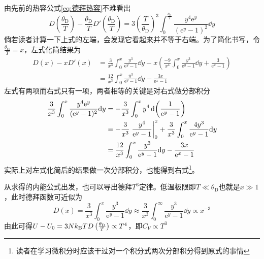 \documentclass[../../main.tex]{subfiles}
\begin{document}
\begin{example}
\begin{solution}
\begin{equation}
\begin{split}
            \end{split}
        \end{equation}
        由先前的热容公式\eqref{eq:德拜热容}不难看出
        \begin{equation}
            D\left(\frac{\theta_{\mathrm{D}}}{T}\right)-\frac{\theta_{\mathrm{D}}}{T}D'\left(\frac{\theta_{\mathrm{D}}}{T}\right)=3\left(\frac{T}{\theta_{\mathrm{D}}}\right)^3\int_0^{\frac{\theta_{\mathrm{D}}}{T}}\frac{y^4\mathrm{e}^{y}}{(\mathrm{e}^{y}-1)^2}\dd y 
        \end{equation}
        倘若读者计算一下上式的左端，会发现它看起来并不等于右端。为了简化书写，令\(\frac{\theta_{\mathrm{D}}}{T}=x\)，左式化简结果为
        \begin{equation}
            \begin{split}
                D(x)-xD'(x)&=\frac{3}{x^3}\int_0^{x}\frac{y^3}{\mathrm{e}^y-1}\dd y-x\left(\frac{-9}{x^4}\int_0^{x}\frac{y^3}{\mathrm{e}^y-1}\dd y+\frac{3}{\mathrm{e}^x-1}\right) \\
                &=\frac{12}{x^3}\int_0^{x}\frac{y^3}{\mathrm{e}^y-1}\dd y-\frac{3x}{\mathrm{e}^x-1}
            \end{split}
        \end{equation}
        左式有两项而右式只有一项，两者相等的关键是对右式做分部积分
        \begin{equation}
            \begin{split}
                \frac{3}{x^3}\int_0^x\frac{y^4\mathrm{e}^y}{(\mathrm{e}^y-1)^2}\dd y&=-\frac{3}{x^3}\int_0^xy^4\dd(\frac{1}{\mathrm{e}^y-1}) \\
                &=-\frac{3}{x^3}\eval{\frac{y^4}{\mathrm{e}^y-1}}_{0}^{x}+\frac{3}{x^3}\int_0^x\frac{4y^3}{\mathrm{e}^y-1}\dd y \\
                &=\frac{12}{x^3}\int_0^{x}\frac{y^3}{\mathrm{e}^y-1}\dd y-\frac{3x}{\mathrm{e}^x-1}
            \end{split}
        \end{equation}
        实际上对左式化简后的结果做一次分部积分，也能得到右式\footnote{读者在学习微积分时应该干过对一个积分式两次分部积分得到原式的事情}。

        从求得的内能公式出发，也可以导出德拜\(T^3\)定律。低温极限即\(T\ll\theta_{\mathrm{D}}\)也就是\(x\gg 1\)，此时德拜函数可近似为
        \begin{equation}
            D(x)=\frac{3}{x^3}\int_0^{x}\frac{y^3}{\mathrm{e}^y-1}\dd y\approx \frac{3}{x^3}\int_0^{\infty}\frac{y^3}{\mathrm{e}^y-1}\dd y\propto x^{-3}
        \end{equation}
        由此可得\(U-U_0=3Nk_{\mathrm{B}} TD\left(\frac{\theta_{\mathrm{D}}}{T}\right)\propto T^4\)，即\(C_V\propto T^3\)
    \end{solution}
\end{example}
\end{document}
